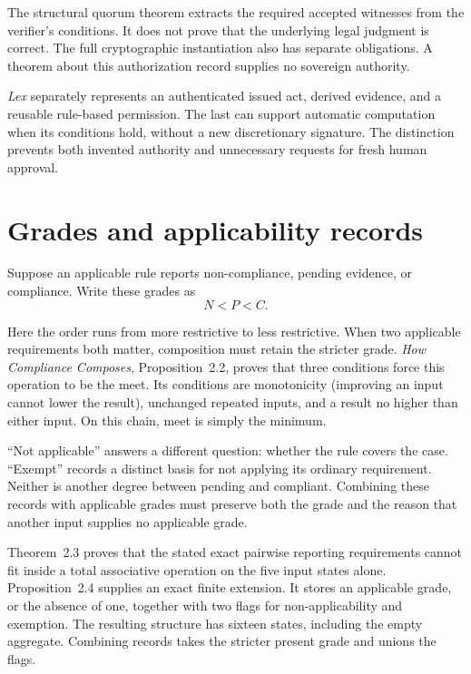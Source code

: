 \documentclass{momentum}
\begin{document}
The structural quorum theorem extracts the required accepted witnesses from the verifier's conditions. It does not prove that the underlying legal judgment is correct. The full cryptographic instantiation also has separate obligations. A theorem about this authorization record supplies no sovereign authority. \cite[Section~3.5, quorum acceptance unfolding]{lex}

\emph{Lex} separately represents an authenticated issued act, derived evidence, and a reusable rule-based permission. The last can support automatic computation when its conditions hold, without a new discretionary signature. The distinction prevents both invented authority and unnecessary requests for fresh human approval. \cite[Sections~4.6--4.7]{lex}

\section{Grades and applicability records}

Suppose an applicable rule reports non-compliance, pending evidence, or compliance. Write these grades as
\[
N < P < C.
\]

Here the order runs from more restrictive to less restrictive. When two applicable requirements both matter, composition must retain the stricter grade. \emph{How Compliance Composes}, Proposition~2.2, proves that three conditions force this operation to be the meet. Its conditions are monotonicity (improving an input cannot lower the result), unchanged repeated inputs, and a result no higher than either input. On this chain, meet is simply the minimum.

``Not applicable'' answers a different question: whether the rule covers the case. ``Exempt'' records a distinct basis for not applying its ordinary requirement. Neither is another degree between pending and compliant. Combining these records with applicable grades must preserve both the grade and the reason that another input supplies no applicable grade.

Theorem~2.3 proves that the stated exact pairwise reporting requirements cannot fit inside a total associative operation on the five input states alone. Proposition~2.4 supplies an exact finite extension. It stores an applicable grade, or the absence of one, together with two flags for non-applicability and exemption. The resulting structure has sixteen states, including the empty aggregate. Combining records takes the stricter present grade and unions the flags. \cite[Section~2.2]{composes}
\end{document}
